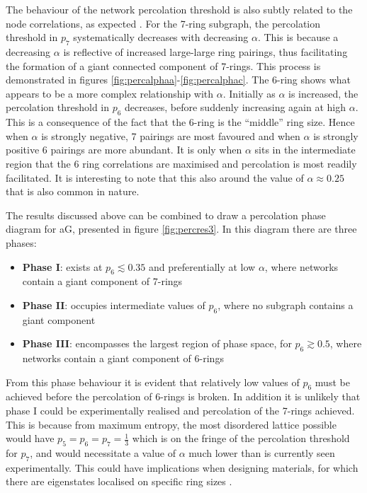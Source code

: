 The behaviour of the network percolation threshold is also subtly related to the node correlations, as expected \cite{Zhou2012,Schmeltzer2014}.
For the 7\--ring subgraph, the percolation threshold in $p_7$ systematically decreases with decreasing $\alpha$.
This is because a decreasing $\alpha$ is reflective of increased large\--large ring pairings, thus facilitating the formation of a giant connected  component of 7\--rings.
This process is demonstrated in figures \ref{fig:percalphaa}\--\ref{fig:percalphac}.
The 6\--ring shows what appears to be a more complex relationship with $\alpha$.
Initially as $\alpha$ is increased, the percolation threshold in $p_6$ decreases, before suddenly increasing again at high $\alpha$.
This is a consequence of the fact that the 6\--ring is the ``middle'' ring size. 
Hence when $\alpha$ is strongly negative, 7 pairings are most favoured and when $\alpha$ is strongly positive 6 pairings are more abundant.
It is only when $\alpha$ sits in the intermediate region that the 6 ring correlations are maximised and percolation is most readily facilitated.
It is interesting to note that this also around the value of $\alpha\approx 0.25$ that is also common in nature.

The results discussed above can be combined to draw a percolation phase diagram for aG, presented in figure \ref{fig:percres3}.
In this diagram there are three phases:
\begin{itemize}
	\item \textbf{Phase I}: exists at $p_6\lesssim 0.35$ and preferentially at low $\alpha$, where networks contain a giant component of 7\--rings
	\item \textbf{Phase II}: occupies intermediate values of $p_6$, where no subgraph contains a giant component
	\item \textbf{Phase III}: encompasses the largest region of phase space, for $p_6\gtrsim0.5$, where networks contain a giant component of 6\--rings
\end{itemize}
From this phase behaviour it is evident that relatively low values of $p_6$ must be achieved before the percolation of 6\--rings is broken.
In addition it is unlikely that phase I could be experimentally realised and percolation of the 7\--rings achieved. 
This is because from maximum entropy, the most disordered lattice possible would have $p_5=p_6=p_7=\frac{1}{3}$ which is on the fringe of the percolation threshold for $p_7$, and would necessitate a value of $\alpha$ much lower than is currently seen experimentally.
This could have implications when designing materials, for which there are eigenstates localised on specific ring sizes \cite{Kapko2010,Zhu2016}.




